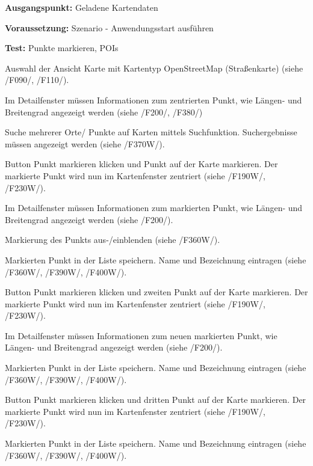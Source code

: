 \documentclass[10pt]{scrreprt}
\newcommand{\sfbf}[1]{\textbf{\sffamily #1}}
\newcommand{\ziel}[1]{{\fontsize{9.5}{11}\textsf{/#1/}}}
\newcommand{\ziellabel}{Z}
\newcommand{\wunsch}{\renewcommand{\labelenumi}{\textbf{\ziel{\ziellabel\numprint{\theenumi}0W}}}}
\newenvironment{details}[1][6pt]{%
  \parskip#1 \parindent6mm \raggedright%
  \def\item{\par\ignorespaces\hangindent=5mm \hangafter1}}{%
  \par\ignorespaces}
\begin{document}
\vspace{1.0cm}
\begin{details}[2pt]
\item \sfbf{Ausgangspunkt:} Geladene Kartendaten 
\item \sfbf{Voraussetzung:} Szenario - Anwendungsstart ausführen
\item \sfbf{Test:} Punkte markieren, POIs 
\end{details}
\vspace{2mm}
\begin{enumerate}[leftmargin = 2.2cm, resume]
\item Auswahl der Ansicht Karte mit Kartentyp OpenStreetMap (Straßenkarte) (siehe \ziel{F090}, \ziel{F110}).
\item Im Detailfenster müssen Informationen zum zentrierten Punkt, wie Längen- und Breitengrad angezeigt werden (siehe \ziel{F200}, \ziel{F380})
\wunsch
\item Suche mehrerer Orte/ Punkte auf Karten mittels Suchfunktion. Suchergebnisse müssen angezeigt werden (siehe \ziel{F370W}).
\item Button Punkt markieren klicken und Punkt auf der Karte markieren. Der markierte Punkt wird nun im Kartenfenster zentriert (siehe \ziel{F190W}, \ziel{F230W}).
\item Im Detailfenster müssen Informationen zum markierten Punkt, wie Längen- und Breitengrad angezeigt werden (siehe \ziel{F200}).
\item Markierung des Punkts aus-/einblenden (siehe \ziel{F360W}).
\item Markierten Punkt in der Liste speichern. Name und Bezeichnung eintragen (siehe \ziel{F360W}, \ziel{F390W}, \ziel{F400W}).
\item Button Punkt markieren klicken und zweiten Punkt auf der Karte markieren. Der markierte Punkt wird nun im Kartenfenster zentriert (siehe \ziel{F190W}, \ziel{F230W}).
\item Im Detailfenster müssen Informationen zum neuen markierten Punkt, wie Längen- und Breitengrad angezeigt werden (siehe \ziel{F200}).
\item Markierten Punkt in der Liste speichern. Name und Bezeichnung eintragen (siehe \ziel{F360W}, \ziel{F390W}, \ziel{F400W}).
\item Button Punkt markieren klicken und dritten Punkt auf der Karte markieren. Der markierte Punkt wird nun im Kartenfenster zentriert (siehe \ziel{F190W}, \ziel{F230W}).
\item Markierten Punkt in der Liste speichern. Name und Bezeichnung eintragen (siehe \ziel{F360W}, \ziel{F390W}, \ziel{F400W}).

\end{enumerate}
\end{document}
